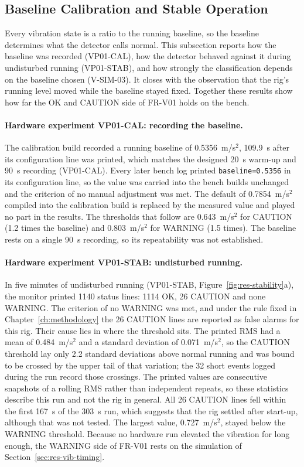\subsection{Baseline Calibration and Stable Operation}
\label{sec:res-vib-baseline}

Every vibration state is a ratio to the running baseline, so the baseline determines what the
detector calls normal. This subsection reports how the baseline was recorded (VP01-CAL), how the
detector behaved against it during undisturbed running (VP01-STAB), and how strongly the
classification depends on the baseline chosen (V-SIM-03). It closes with the observation that the
rig's running level moved while the baseline stayed fixed. Together these results show how far the
OK and CAUTION side of FR-V01 holds on the bench.

\paragraph{Hardware experiment VP01-CAL: recording the baseline.}
The calibration build recorded a running baseline of 0.5356~m/s$^2$, 109.9~s after its configuration
line was printed, which matches the designed 20~s warm-up and 90~s recording (VP01-CAL). Every later
bench log printed \texttt{baseline=0.5356} in its configuration line, so the value was carried into
the bench builds unchanged and the criterion of no manual adjustment was met. The default of
0.7854~m/s$^2$ compiled into the calibration build is replaced by the measured value and played no
part in the results. The thresholds that follow are 0.643~m/s$^2$ for CAUTION (1.2 times the
baseline) and 0.803~m/s$^2$ for WARNING (1.5 times). The baseline rests on a single 90~s recording,
so its repeatability was not established.

\paragraph{Hardware experiment VP01-STAB: undisturbed running.}
In five minutes of undisturbed running (VP01-STAB, Figure~\ref{fig:res-stability}a), the monitor
printed 1140 status lines: 1114 OK, 26 CAUTION and none WARNING. The criterion of no WARNING was met,
and under the rule fixed in Chapter~\ref{ch:methodology} the 26 CAUTION lines are reported as false
alarms for this rig. Their cause lies in where the threshold sits. The printed RMS had a mean of
0.484~m/s$^2$ and a standard deviation of 0.071~m/s$^2$, so the CAUTION threshold lay only
2.2 standard deviations above normal running and was bound to be crossed by the upper tail of that
variation; the 32 short events logged during the run record those crossings. The printed values are
consecutive snapshots of a rolling RMS rather than independent repeats, so these statistics describe
this run and not the rig in general. All 26 CAUTION lines fell within the first 167~s of the 303~s
run, which suggests that the rig settled after start-up, although that was not tested. The largest
value, 0.727~m/s$^2$, stayed below the WARNING threshold. Because no hardware run elevated the
vibration for long enough, the WARNING side of FR-V01 rests on the simulation of
Section~\ref{sec:res-vib-timing}.

